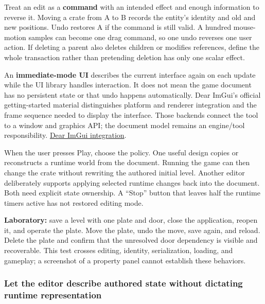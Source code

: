Treat an edit as a \textbf{command} with an intended effect and enough information to reverse it. Moving a crate from A to B records the entity's identity and old and new positions. Undo restores A if the command is still valid. A hundred mouse-motion samples can become one drag command, so one undo reverses one user action. If deleting a parent also deletes children or modifies references, define the whole transaction rather than pretending deletion has only one scalar effect.

An \textbf{immediate-mode UI} describes the current interface again on each update while the UI library handles interaction. It does not mean the game document has no persistent state or that undo happens automatically. Dear ImGui's official getting-started material distinguishes platform and renderer integration and the frame sequence needed to display the interface. Those backends connect the tool to a window and graphics API; the document model remains an engine/tool responsibility. \href{https://github.com/ocornut/imgui/wiki/Getting-Started}{Dear ImGui integration}.

When the user presses Play, choose the policy. One useful design copies or reconstructs a runtime world from the document. Running the game can then change the crate without rewriting the authored initial level. Another editor deliberately supports applying selected runtime changes back into the document. Both need explicit state ownership. A ``Stop'' button that leaves half the runtime timers active has not restored editing mode.

\textbf{Laboratory:} save a level with one plate and door, close the application, reopen it, and operate the plate. Move the plate, undo the move, save again, and reload. Delete the plate and confirm that the unresolved door dependency is visible and recoverable. This test crosses editing, identity, serialization, loading, and gameplay; a screenshot of a property panel cannot establish these behaviors.

\subsubsection{Let the editor describe authored state without dictating runtime representation}\label{06-engine-ii-ch032-let-the-editor-describe-authored-state-without-dictating-runtime-representation}

\hypertarget{06-engine-ii-ch032-let-the-editor-describe-authored-state-without-dictating-runtime-representation}{}

